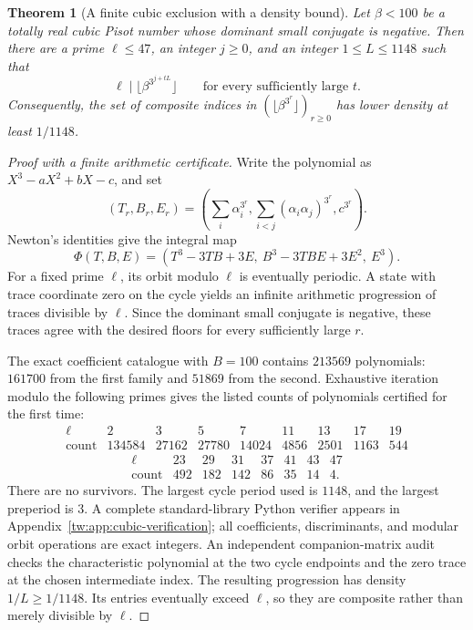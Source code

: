 \documentclass[11pt,a4paper]{article}
\newtheorem{theorem}{Theorem}[section]
\theoremstyle{definition}
\theoremstyle{remark}
\numberwithin{equation}{section}
\begin{document}
\begin{theorem}[A finite cubic exclusion with a density bound]\label{tw:thm:cubic-bounded}
Let $\beta<100$ be a totally real cubic Pisot number whose dominant
small conjugate is negative. Then there are a prime $\ell\le47$,
an integer $j\ge0$, and an integer $1\le L\le1148$ such that
\[
 \ell\mid\lfloor\beta^{3^{j+tL}}\rfloor
 \qquad\text{for every sufficiently large }t.
\]
Consequently, the set of composite indices in
$(\lfloor\beta^{3^r}\rfloor)_{r\ge0}$ has lower density at least
$1/1148$.
\end{theorem}
\begin{proof}[Proof with a finite arithmetic certificate]
Write the polynomial as $X^3-aX^2+bX-c$, and set
\[
 (T_r,B_r,E_r)=
 \left(\sum_i\alpha_i^{3^r},
       \sum_{i<j}(\alpha_i\alpha_j)^{3^r},c^{3^r}\right).
\]
Newton's identities give the integral map
\[
 \Phi(T,B,E)=
 (T^3-3TB+3E,\ B^3-3TBE+3E^2,\ E^3).
\]
For a fixed prime $\ell$, its orbit modulo $\ell$ is eventually
periodic. A state with trace coordinate zero on the cycle yields
an infinite arithmetic progression of traces divisible by $\ell$.
Since the dominant small conjugate is negative, these traces agree
with the desired floors for every sufficiently large $r$.

The exact coefficient catalogue with $B=100$ contains $213569$
polynomials: $161700$ from the first family and $51869$ from the
second. Exhaustive iteration modulo the following primes gives the
listed counts of polynomials certified for the first time:
\[
\begin{array}{c|rrrrrrrr}
\ell&2&3&5&7&11&13&17&19\\\hline
\text{count}&134584&27162&27780&14024&4856&2501&1163&544
\end{array}
\]
\[
\begin{array}{c|rrrrrrr}
\ell&23&29&31&37&41&43&47\\\hline
\text{count}&492&182&142&86&35&14&4.
\end{array}
\]
There are no survivors. The largest cycle period used is $1148$,
and the largest preperiod is $3$. A complete standard-library Python verifier appears in
Appendix~\ref{tw:app:cubic-verification}; all coefficients,
discriminants, and modular orbit operations are exact integers.
An independent companion-matrix audit checks the characteristic
polynomial at the two cycle endpoints and the zero trace at the
chosen intermediate index. The resulting progression has density
$1/L\ge1/1148$. Its entries eventually exceed $\ell$, so they are
composite rather than merely divisible by $\ell$.
\end{proof}
\end{document}
